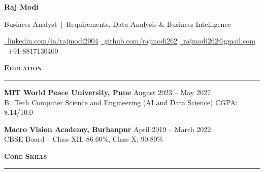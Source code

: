 \documentclass[a4paper,10pt]{article}
\newcommand{\sectionHeader}[2]{%
  \vspace{3.5pt}%
  \noindent%
  {\normalsize\bfseries\color{HeaderDark}#2\enspace\textsc{#1}}%
  \\[-6pt]%
  {\color{SectionLine}\rule{\textwidth}{1pt}}%
  \vspace{1pt}\par%
}
\newcommand{\eduEntry}[4]{%
  \vspace{1pt}%
  \noindent\textbf{\color{HeaderDark}#1} \hfill {\small\color{SubText}#2}\\[-3pt]%
  {\small\color{MidGray}#3} \hfill {\small\color{SubText}#4}%
  \vspace{0pt}\par%
}
\begin{document}

\begin{center}
  {\fontsize{24}{28}\selectfont\bfseries\color{HeaderDark}Raj Modi}

  \vspace{2pt}

  {\small\color{MidGray}Business Analyst \,|\, Requirements, Data Analysis \& Business Intelligence}

  \vspace{3pt}

  {\small%
    \href{https://www.linkedin.com/in/rajmodi2004/}{{\color{AccentBlue}\faLinkedin}~\color{LinkBlue}linkedin.com/in/rajmodi2004}%
    \quad{\color{LightGray}|}%
    \quad\href{https://github.com/rajmodi262}{{\color{AccentBlue}\faGithub}~\color{LinkBlue}github.com/rajmodi262}%
    \quad{\color{LightGray}|}%
    \quad\href{mailto:rajmodi262@gmail.com}{{\color{AccentBlue}\faEnvelope}~\color{LinkBlue}rajmodi262@gmail.com}%
    \quad{\color{LightGray}|}%
    \quad{\color{AccentBlue}\faPhone*}~{\color{DarkGray}+91-8817130400}%
  }
\end{center}

\vspace{-2pt}


\sectionHeader{Education}{\faGraduationCap}

\eduEntry{MIT World Peace University, Pune}
  {August 2023 -- May 2027}
  {B.\ Tech Computer Science and Engineering (AI and Data Science)}
  {CGPA: 8.14/10.0}

\eduEntry{Macro Vision Academy, Burhanpur}
  {April 2019 -- March 2022}
  {CBSE Board -- Class XII: 86.60\%, Class X: 90.80\%}
  {}


\sectionHeader{Core Skills}{\faCogs}
\end{document}
